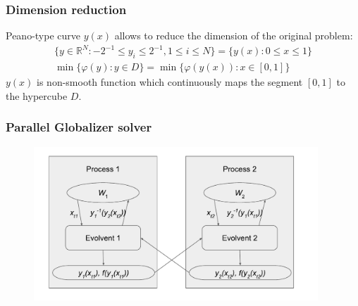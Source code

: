\documentclass[aspectratio=1610]{beamer}
\begin{document}
\begin{frame}
  \begin{center}
  \frametitle{Dimension reduction}
  Peano-type curve \(y(x)\) allows to reduce the dimension of the original problem:
  \begin{gather}
    \lbrace y\in \mathbb{R}^N:-2^{-1}\leqslant y_i\leqslant 2^{-1},1\leqslant i\leqslant N\rbrace=\{y(x):0\leqslant x\leqslant 1\} \nonumber \\
    \min\{\varphi(y): y\in D\}=\min\{\varphi(y(x)): x\in [0,1]\} \nonumber
  \end{gather}
  \(y(x)\) is non-smooth function which continuously maps the segment \([0,1]\) to the hypercube \(D\).
  \begin{figure}[ht]
    \vspace*{-0.5cm}
  \end{figure}
\end{center}
\end{frame}

\begin{frame}
  \frametitle{Parallel Globalizer solver}
  \begin{figure}[ht]
    \includegraphics[width=0.95\textwidth]{evolvents_parallel.pdf}
  \end{figure}
\end{frame}
\end{document}
